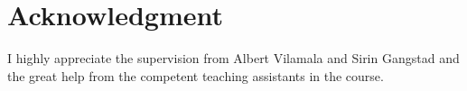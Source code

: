 \section{Acknowledgment}
\label{sec:acknowledgment}
I highly appreciate the supervision from Albert Vilamala and Sirin Gangstad and the great help from the competent teaching assistants in the course.